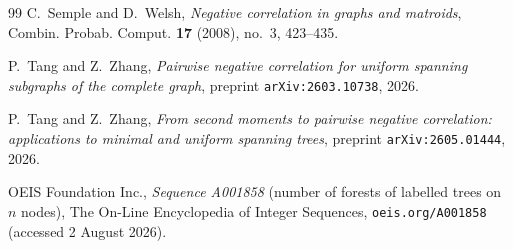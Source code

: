 \documentclass[11pt,a4paper]{amsart}
\theoremstyle{plain}
\theoremstyle{definition}
\begin{document}
\begin{thebibliography}{99}
 C.~Semple and D.~Welsh,
\emph{Negative correlation in graphs and matroids},
Combin. Probab. Comput. \textbf{17} (2008), no.~3, 423--435.

 P.~Tang and Z.~Zhang,
\emph{Pairwise negative correlation for uniform spanning subgraphs of the
complete graph}, preprint \texttt{arXiv:2603.10738}, 2026.

 P.~Tang and Z.~Zhang,
\emph{From second moments to pairwise negative correlation: applications to
minimal and uniform spanning trees}, preprint \texttt{arXiv:2605.01444}, 2026.

 OEIS Foundation Inc., \emph{Sequence A001858}
(number of forests of labelled trees on $n$ nodes),
The On-Line Encyclopedia of Integer Sequences,
\texttt{oeis.org/A001858} (accessed 2 August 2026).

\end{thebibliography}
\end{document}
